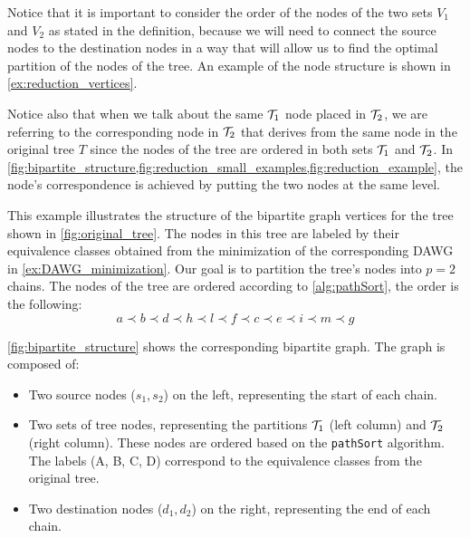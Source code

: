 Notice that it is important to consider the order of the nodes of the two sets $V_1$ and $V_2$ as stated in the definition, because we will need to connect the source nodes to the destination nodes in a way that will allow us to find the optimal partition of the nodes of the tree. An example of the node structure is shown in \cref{ex:reduction_vertices}.

Notice also that when we talk about the same $\treeset{1}$ node placed in $\treeset{2}$, we are referring to the corresponding node in $\treeset{2}$ that derives from the same node in the original tree $T$ since the nodes of the tree are ordered in both sets $\treeset{1}$ and $\treeset{2}$. In \cref{fig:bipartite_structure,fig:reduction_small_examples,fig:reduction_example}, the node's correspondence is achieved by putting the two nodes at the same level.
\begin{example}[Vertices] \label{ex:reduction_vertices}
    This example illustrates the structure of the bipartite graph vertices for the tree shown in \cref{fig:original_tree}. The nodes in this tree are labeled by their equivalence classes obtained from the minimization of the corresponding DAWG in \cref{ex:DAWG_minimization}. Our goal is to partition the tree's nodes into $p=2$ chains. The nodes of the tree are ordered according to \cref{alg:pathSort}, the order is the following: 
    \[
        a \prec b \prec d \prec h \prec l \prec f \prec c \prec e \prec i \prec m \prec g
    \]

    \cref{fig:bipartite_structure} shows the corresponding bipartite graph. The graph is composed of:
    \begin{itemize}
        \item Two source nodes ($s_1, s_2$) on the left, representing the start of each chain.
        \item Two sets of tree nodes, representing the partitions $\treeset{1}$ (left column) and $\treeset{2}$ (right column). These nodes are ordered based on the \texttt{pathSort} algorithm. The labels (A, B, C, D) correspond to the equivalence classes from the original tree.
        \item Two destination nodes ($d_1, d_2$) on the right, representing the end of each chain.
    \end{itemize}

    \begin{figure}[H]
        \centering
        \begin{tikzpicture}[
            level distance=1.5cm,
            sibling distance=3cm,
            state/.style={circle, draw, minimum size=7mm},
            accepting/.style={circle, draw, double, minimum size=7mm},
            edge from parent/.style={draw, -latex},
            level 1/.style={sibling distance=4cm},
            level 2/.style={sibling distance=2.5cm},
            level 3/.style={sibling distance=2cm}
            ]
        

\end{tikzpicture}
\end{figure}
\end{example}

